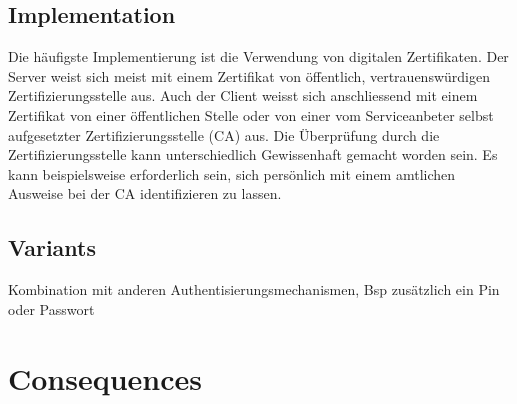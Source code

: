 \subsection{Implementation}
Die häufigste Implementierung ist die Verwendung von digitalen Zertifikaten. Der Server weist sich meist mit einem Zertifikat von öffentlich, vertrauenswürdigen Zertifizierungsstelle aus. Auch der Client weisst sich anschliessend mit einem Zertifikat von einer öffentlichen Stelle oder von einer vom Serviceanbeter selbst aufgesetzter Zertifizierungsstelle (CA) aus. Die Überprüfung durch die Zertifizierungsstelle kann unterschiedlich Gewissenhaft gemacht worden sein. Es kann beispielsweise erforderlich sein, sich persönlich mit einem amtlichen Ausweise bei der CA identifizieren zu lassen.

\subsection{Variants}
Kombination mit anderen Authentisierungsmechanismen, Bsp zusätzlich ein Pin oder Passwort

\section{Consequences}
\begin{samepage}
  \begin{itemize}
  \end{itemize}
\end{samepage}

